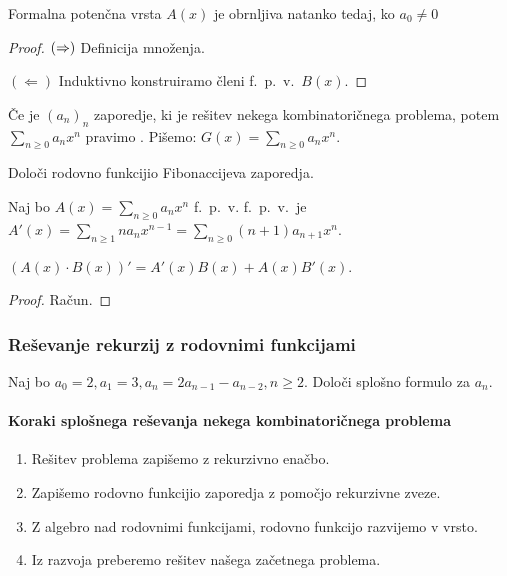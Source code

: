 \begin{trditev}
    Formalna potenčna vrsta $A(x)$ je obrnljiva natanko tedaj, ko $a_0 \neq 0$
\end{trditev}

\begin{proof}
    $(\Rightarrow)$ Definicija množenja.

    $(\Leftarrow)$ Induktivno konstruiramo členi f.\ p.\ v.\ $B(x)$.
\end{proof}

\begin{definicija}
    Če je $(a_n)_n$ zaporedje, ki je rešitev nekega kombinatoričnega problema, potem $\sum_{n \geq 0}a_n x^n$ pravimo . Pišemo: $G(x) = \sum_{n \geq 0}a_n x^n$.
\end{definicija}

\begin{primer}
    Določi rodovno funkcijio Fibonaccijeva zaporedja.
\end{primer}

\begin{definicija}
    Naj bo $A(x) = \sum_{n \geq 0}a_n x^n$ f.\ p.\ v.  f.\ p.\ v.\ je $A'(x) =  \sum_{n \geq 1}na_n x^{n-1} =  \sum_{n \geq 0}(n+1)a_{n+1} x^n$.
\end{definicija}

\begin{trditev}
    $(A(x) \cdot B(x))' = A'(x)B(x) + A(x)B'(x)$.
\end{trditev}

\begin{proof}
    Račun.
\end{proof}

\subsubsection*{Reševanje rekurzij z rodovnimi funkcijami}
\begin{primer}
    Naj bo $a_0 = 2, a_1 = 3, a_n = 2a_{n-1}-a_{n-2}, n \geq 2$. Določi splošno formulo za $a_n$.
\end{primer}
\paragraph{Koraki splošnega reševanja nekega kombinatoričnega problema}
\begin{enumerate}
    \item Rešitev problema zapišemo z rekurzivno enačbo.
    \item Zapišemo rodovno funkcijio zaporedja z pomočjo rekurzivne zveze.
    \item Z algebro nad rodovnimi funkcijami, rodovno funkcijo razvijemo v vrsto.
    \item Iz razvoja preberemo rešitev našega začetnega problema.
\end{enumerate}

